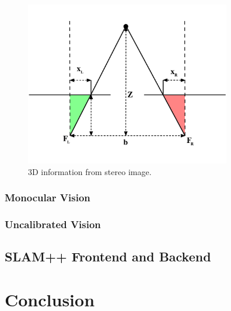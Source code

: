 \begin{figure}[ht]
	\begin{center}
		\includegraphics[keepaspectratio,width=9cm]{fig/stereo.pdf}
	\end{center}
	\caption{3D information from stereo image.}
	\label{fig:stereo}
\end{figure}


\subsection*{Monocular Vision}
\subsection*{Uncalibrated Vision}
\section{SLAM++ Frontend and Backend}

\chapter{Conclusion}
\label{chapter:conclusion}

